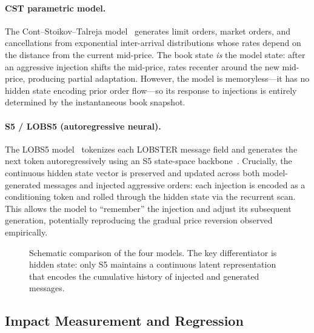 \documentclass[sigplan,screen,anonymous]{acmart}
\begin{document}
\paragraph{CST parametric model.} The Cont--Stoikov--Talreja model~\cite{stoikov2008option} generates limit orders, market orders, and cancellations from exponential inter-arrival distributions whose rates depend on the distance from the current mid-price. The book state \emph{is} the model state: after an aggressive injection shifts the mid-price, rates recenter around the new mid-price, producing partial adaptation. However, the model is memoryless---it has no hidden state encoding prior order flow---so its response to injections is entirely determined by the instantaneous book snapshot.

\paragraph{S5 / LOBS5 (autoregressive neural).} The LOBS5 model~\cite{nagy2023generative} tokenizes each LOBSTER message field and generates the next token autoregressively using an S5 state-space backbone~\cite{smith2023s5}. Crucially, the continuous hidden state vector is preserved and updated across both model-generated messages and injected aggressive orders: each injection is encoded as a conditioning token and rolled through the hidden state via the recurrent scan. This allows the model to ``remember'' the injection and adjust its subsequent generation, potentially reproducing the gradual price reversion observed empirically.

\begin{figure}[t]
  \centering
  \caption{Schematic comparison of the four models. The key differentiator is hidden state: only S5 maintains a continuous latent representation that encodes the cumulative history of injected and generated messages.}
  \label{fig:architectures}
\end{figure}

\subsection{Impact Measurement and Regression}
\label{sec:measurement}
\end{document}
